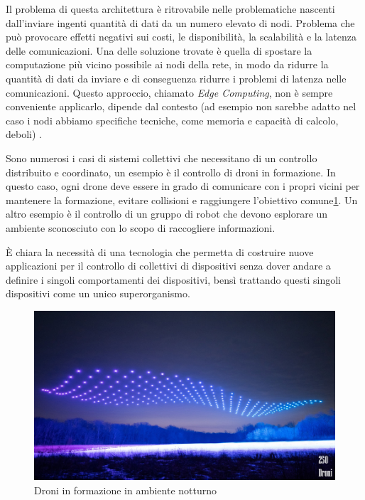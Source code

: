 \documentclass[12pt,a4paper,openright,twoside]{book}
\begin{document}
Il problema di questa architettura è ritrovabile nelle problematiche nascenti dall'inviare ingenti quantità di dati da un numero elevato di nodi. Problema che può provocare effetti negativi sui costi, le disponibilità, la scalabilità e la latenza delle comunicazioni. Una delle soluzione trovate è quella di spostare la computazione più vicino possibile ai nodi della rete, in modo da ridurre la quantità di dati da inviare e di conseguenza ridurre i problemi di latenza nelle comunicazioni. Questo approccio, chiamato \textit{Edge Computing}, non è sempre conveniente applicarlo, dipende dal contesto (ad esempio non sarebbe adatto nel caso i nodi abbiamo specifiche tecniche, come memoria e capacità di calcolo, deboli) \cite{Testa2022}. 


Sono numerosi i casi di sistemi collettivi che necessitano di un controllo distribuito e coordinato, un esempio è il controllo di droni in formazione. In questo caso, ogni drone deve essere in grado di comunicare con i propri vicini per mantenere la formazione, evitare collisioni e raggiungere l'obiettivo comune\cref{fig:drones}. Un altro esempio è il controllo di un gruppo di robot che devono esplorare un ambiente sconosciuto con lo scopo di raccogliere informazioni.

È chiara la necessità di una tecnologia che permetta di costruire nuove applicazioni per il controllo di collettivi di dispositivi senza dover andare a definire i singoli comportamenti dei dispositivi, bensì trattando questi singoli dispositivi come un unico superorganismo.

\begin{figure}
    \centering
    \includegraphics[width=.7\linewidth]{figures/drones.jpg}
    \caption{Droni in formazione in ambiente notturno}
    \label{fig:drones}
\end{figure}
\end{document}
